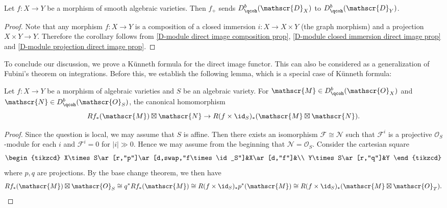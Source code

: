 \begin{corollary}\label{D-module direct image functor qcoh}
Let $f:X\to Y$ be a morphism of smooth algebraic varieties. Then $f_+$ sends $D^b_{\qcoh}(\mathscr{D}_X)$ to $D^b_{\qcoh}(\mathscr{D}_Y)$.
\end{corollary}
\begin{proof}
Note that any morphism $f:X\to Y$ is a composition of a closed immersion $i:X\to X\times Y$ (the graph morphism) and a projection $X\times Y\to Y$. Therefore the corollary follows from \cref{D-module direct image composition prop}, \cref{D-module closed immersion direct image prop} and \cref{D-module projection direct image prop}.
\end{proof}

To conclude our discussion, we prove a K\"unneth formula for the direct image functor. This can also be considered as a generalization of Fubini's theorem on integrations. Before this, we establish the following lemma, which is a special case of K\"unneth formula:
\begin{lemma}\label{D-module integral product with id Kunneth formula}
Let $f:X\to Y$ be a morphism of algebraic varieties and $S$ be an algebraic variety. For $\mathscr{M}\in D^b_{\qcoh}(\mathscr{O}_X)$ and $\mathscr{N}\in D^b_{\qcoh}(\mathscr{O}_S)$, the canonical homomorphism
\[Rf_*(\mathscr{M})\boxtimes\mathscr{N}\to R(f\times\id_S)_*(\mathscr{M}\boxtimes\mathscr{N}).\]
\end{lemma}
\begin{proof}
Since the question is local, we may assume that $S$ is affine. Then there exists an isomorphism $\mathscr{F}\cong\mathscr{N}$ such that $\mathscr{F}^i$ is a projective $\mathscr{O}_S$-module for each $i$ and $\mathscr{F}^i=0$ for $|i|\gg 0$. Hence we may assume from the beginning that $\mathscr{N}=\mathscr{O}_S$. Consider the cartesian square
\[\begin{tikzcd}
X\times S\ar[r,"p"]\ar[d,swap,"f\times\id_S"]&X\ar[d,"f"]&\\
Y\times S\ar[r,"q"]&Y
\end{tikzcd}\]
where $p,q$ are projections. By the base change theorem, we then have
\begin{equation*}
Rf_*(\mathscr{M})\boxtimes\mathscr{O}_S\cong q^*Rf_*(\mathscr{M})\cong R(f\times\id_S)_*p^*(\mathscr{M})\cong R(f\times\id_S)_*(\mathscr{M}\boxtimes\mathscr{O}_T).\qedhere
\end{equation*}
\end{proof}

